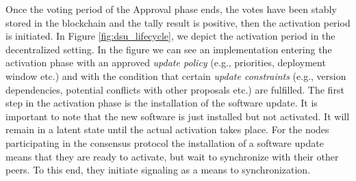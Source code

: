 Once the voting period of the Approval phase ends, the votes have been stably 
stored in the blockchain and the tally result is positive, then the activation 
period is initiated. In Figure \ref{fig:dsu_lifecycle}, we depict the 
activation period in the decentralized setting.
In the figure we can see an implementation entering the activation phase with 
an approved \emph{update policy} (e.g., priorities, deployment window etc.) and 
with the condition that certain \emph{update constraints} (e.g., version 
dependencies, potential conflicts with other proposals etc.) are fulfilled.
The first step in the activation phase is the installation of the software 
update. It is important to note that the new software is just installed but not 
activated. It will remain in a latent state until the actual activation takes 
place. For the nodes participating in the consensus protocol the installation 
of a software update means that they are ready to activate, but wait to 
synchronize with their other peers. To this end, they initiate signaling as a 
means to synchronization. %

